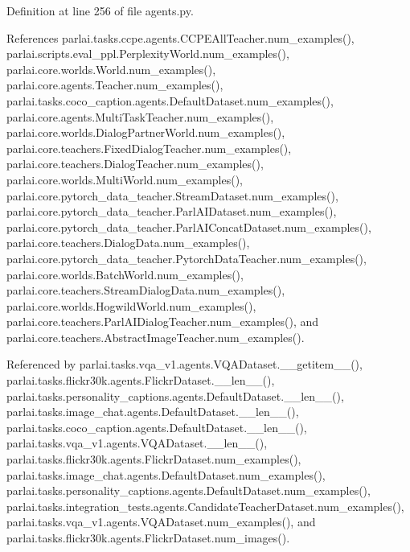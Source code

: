 Definition at line 256 of file agents.\+py.



References parlai.\+tasks.\+ccpe.\+agents.\+C\+C\+P\+E\+All\+Teacher.\+num\+\_\+examples(), parlai.\+scripts.\+eval\+\_\+ppl.\+Perplexity\+World.\+num\+\_\+examples(), parlai.\+core.\+worlds.\+World.\+num\+\_\+examples(), parlai.\+core.\+agents.\+Teacher.\+num\+\_\+examples(), parlai.\+tasks.\+coco\+\_\+caption.\+agents.\+Default\+Dataset.\+num\+\_\+examples(), parlai.\+core.\+agents.\+Multi\+Task\+Teacher.\+num\+\_\+examples(), parlai.\+core.\+worlds.\+Dialog\+Partner\+World.\+num\+\_\+examples(), parlai.\+core.\+teachers.\+Fixed\+Dialog\+Teacher.\+num\+\_\+examples(), parlai.\+core.\+teachers.\+Dialog\+Teacher.\+num\+\_\+examples(), parlai.\+core.\+worlds.\+Multi\+World.\+num\+\_\+examples(), parlai.\+core.\+pytorch\+\_\+data\+\_\+teacher.\+Stream\+Dataset.\+num\+\_\+examples(), parlai.\+core.\+pytorch\+\_\+data\+\_\+teacher.\+Parl\+A\+I\+Dataset.\+num\+\_\+examples(), parlai.\+core.\+pytorch\+\_\+data\+\_\+teacher.\+Parl\+A\+I\+Concat\+Dataset.\+num\+\_\+examples(), parlai.\+core.\+teachers.\+Dialog\+Data.\+num\+\_\+examples(), parlai.\+core.\+pytorch\+\_\+data\+\_\+teacher.\+Pytorch\+Data\+Teacher.\+num\+\_\+examples(), parlai.\+core.\+worlds.\+Batch\+World.\+num\+\_\+examples(), parlai.\+core.\+teachers.\+Stream\+Dialog\+Data.\+num\+\_\+examples(), parlai.\+core.\+worlds.\+Hogwild\+World.\+num\+\_\+examples(), parlai.\+core.\+teachers.\+Parl\+A\+I\+Dialog\+Teacher.\+num\+\_\+examples(), and parlai.\+core.\+teachers.\+Abstract\+Image\+Teacher.\+num\+\_\+examples().



Referenced by parlai.\+tasks.\+vqa\+\_\+v1.\+agents.\+V\+Q\+A\+Dataset.\+\_\+\+\_\+getitem\+\_\+\+\_\+(), parlai.\+tasks.\+flickr30k.\+agents.\+Flickr\+Dataset.\+\_\+\+\_\+len\+\_\+\+\_\+(), parlai.\+tasks.\+personality\+\_\+captions.\+agents.\+Default\+Dataset.\+\_\+\+\_\+len\+\_\+\+\_\+(), parlai.\+tasks.\+image\+\_\+chat.\+agents.\+Default\+Dataset.\+\_\+\+\_\+len\+\_\+\+\_\+(), parlai.\+tasks.\+coco\+\_\+caption.\+agents.\+Default\+Dataset.\+\_\+\+\_\+len\+\_\+\+\_\+(), parlai.\+tasks.\+vqa\+\_\+v1.\+agents.\+V\+Q\+A\+Dataset.\+\_\+\+\_\+len\+\_\+\+\_\+(), parlai.\+tasks.\+flickr30k.\+agents.\+Flickr\+Dataset.\+num\+\_\+examples(), parlai.\+tasks.\+image\+\_\+chat.\+agents.\+Default\+Dataset.\+num\+\_\+examples(), parlai.\+tasks.\+personality\+\_\+captions.\+agents.\+Default\+Dataset.\+num\+\_\+examples(), parlai.\+tasks.\+integration\+\_\+tests.\+agents.\+Candidate\+Teacher\+Dataset.\+num\+\_\+examples(), parlai.\+tasks.\+vqa\+\_\+v1.\+agents.\+V\+Q\+A\+Dataset.\+num\+\_\+examples(), and parlai.\+tasks.\+flickr30k.\+agents.\+Flickr\+Dataset.\+num\+\_\+images().

